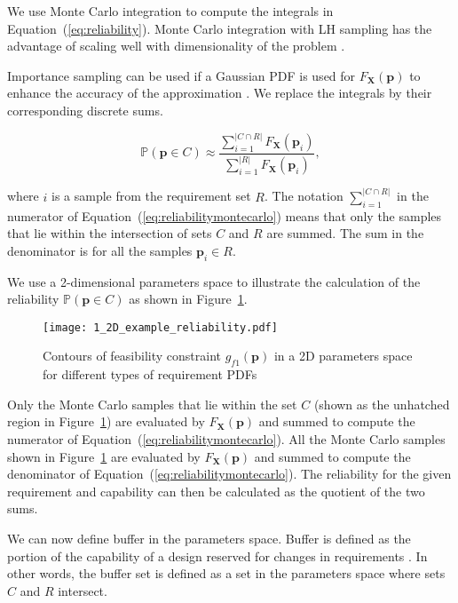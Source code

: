 We use Monte Carlo integration to compute the integrals in Equation~(\ref{eq:reliability}). Monte Carlo integration with \acf{LH} sampling has the advantage of scaling well with dimensionality of the problem \cite{Magnusen1997,Zhang2016}.

Importance sampling can be used if a Gaussian \ac{PDF} is used for $F_\mathbf{X}(\mathbf{p})$ to enhance the accuracy of the approximation \cite{Frangopol2003a,ForouzandehShahraki2014,Kleiber2004}. We replace the integrals by their corresponding discrete sums.

\begin{equation} \label{eq:reliabilitymontecarlo}
	\mathbb{P}(\mathbf{p} \in C) \approx \dfrac{\sum\limits_{i=1}^{|{C\cap R}|} F_{\mathbf{X}}(\mathbf{p}_i)}{\sum\limits_{i=1}^{|R|} F_{\mathbf{X}}(\mathbf{p}_i)},
\end{equation}

where $i$ is a sample from the requirement set $R$. The notation $\sum_{i=1}^{|{C\cap R}|}$ in the numerator of Equation~(\ref{eq:reliabilitymontecarlo}) means that only the samples that lie within the intersection of sets $C$ and $R$ are summed. The sum in the denominator is for all the samples $\mathbf{p}_i \in R$.

We use a 2-dimensional parameters space to illustrate the calculation of the reliability $\mathbb{P}(\mathbf{p} \in C)$ as shown in Figure~\ref{fig:2Dexamplereliability}.

\begin{figure}[h!]
	\centering
	\texttt{[image: 1\_2D\_example\_reliability.pdf]}
	\caption{Contours of feasibility constraint $g_{f1}(\mathbf{p})$ in a 2D parameters space for different types of requirement \acp{PDF}}
	\label{fig:2Dexamplereliability}
\end{figure}

Only the Monte Carlo samples that lie within the set $C$ (shown as the unhatched region in Figure~\ref{fig:2Dexamplereliability}) are evaluated by $F_{\mathbf{X}}(\mathbf{p})$ and summed to compute the numerator of Equation~(\ref{eq:reliabilitymontecarlo}). All the Monte Carlo samples shown in Figure~\ref{fig:2Dexamplereliability} are evaluated by $F_{\mathbf{X}}(\mathbf{p})$ and summed to compute the denominator of Equation~(\ref{eq:reliabilitymontecarlo}). The reliability for the given requirement and capability can then be calculated as the quotient of the two sums.

We can now define buffer in the parameters space. Buffer is defined as the portion of the capability of a design reserved for changes in requirements \cite{Eckert2019}. In other words, the buffer set is defined as a set in the parameters space where sets $C$ and $R$ intersect.

